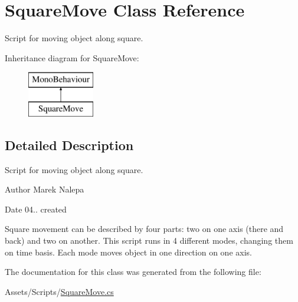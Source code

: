\hypertarget{class_square_move}{}\section{Square\+Move Class Reference}
\label{class_square_move}


Script for moving object along square.  


Inheritance diagram for Square\+Move\+:\begin{figure}[H]
\begin{center}
\leavevmode
\includegraphics[height=2.000000cm]{class_square_move}
\end{center}
\end{figure}


\subsection{Detailed Description}
Script for moving object along square. 

\begin{DoxyAuthor}{Author}
Marek Nalepa 
\end{DoxyAuthor}
\begin{DoxyDate}{Date}
04.. created
\end{DoxyDate}
Square movement can be described by four parts\+: two on one axis (there and back) and two on another. This script runs in 4 different modes, changing them on time basis. Each mode moves object in one direction on one axis. 

The documentation for this class was generated from the following file\+:\begin{DoxyCompactItemize}
\item 
Assets/\+Scripts/\hyperlink{_square_move_8cs}{Square\+Move.\+cs}\end{DoxyCompactItemize}

